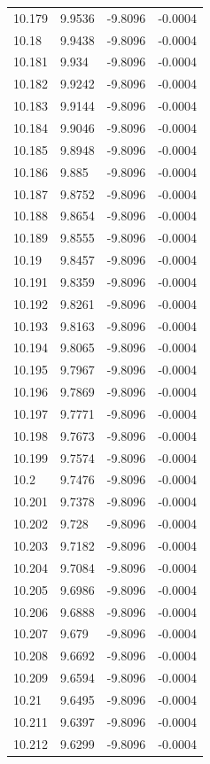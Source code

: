\begin{tabular}{llll}
10.179 & 9.9536 & -9.8096 & -0.0004 \\
10.18 & 9.9438 & -9.8096 & -0.0004 \\
10.181 & 9.934 & -9.8096 & -0.0004 \\
10.182 & 9.9242 & -9.8096 & -0.0004 \\
10.183 & 9.9144 & -9.8096 & -0.0004 \\
10.184 & 9.9046 & -9.8096 & -0.0004 \\
10.185 & 9.8948 & -9.8096 & -0.0004 \\
10.186 & 9.885 & -9.8096 & -0.0004 \\
10.187 & 9.8752 & -9.8096 & -0.0004 \\
10.188 & 9.8654 & -9.8096 & -0.0004 \\
10.189 & 9.8555 & -9.8096 & -0.0004 \\
10.19 & 9.8457 & -9.8096 & -0.0004 \\
10.191 & 9.8359 & -9.8096 & -0.0004 \\
10.192 & 9.8261 & -9.8096 & -0.0004 \\
10.193 & 9.8163 & -9.8096 & -0.0004 \\
10.194 & 9.8065 & -9.8096 & -0.0004 \\
10.195 & 9.7967 & -9.8096 & -0.0004 \\
10.196 & 9.7869 & -9.8096 & -0.0004 \\
10.197 & 9.7771 & -9.8096 & -0.0004 \\
10.198 & 9.7673 & -9.8096 & -0.0004 \\
10.199 & 9.7574 & -9.8096 & -0.0004 \\
10.2 & 9.7476 & -9.8096 & -0.0004 \\
10.201 & 9.7378 & -9.8096 & -0.0004 \\
10.202 & 9.728 & -9.8096 & -0.0004 \\
10.203 & 9.7182 & -9.8096 & -0.0004 \\
10.204 & 9.7084 & -9.8096 & -0.0004 \\
10.205 & 9.6986 & -9.8096 & -0.0004 \\
10.206 & 9.6888 & -9.8096 & -0.0004 \\
10.207 & 9.679 & -9.8096 & -0.0004 \\
10.208 & 9.6692 & -9.8096 & -0.0004 \\
10.209 & 9.6594 & -9.8096 & -0.0004 \\
10.21 & 9.6495 & -9.8096 & -0.0004 \\
10.211 & 9.6397 & -9.8096 & -0.0004 \\
10.212 & 9.6299 & -9.8096 & -0.0004 \\

\end{tabular}
